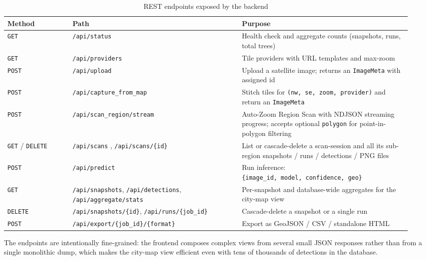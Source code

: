 \begin{longtable}[]{@{}>{\raggedright\arraybackslash}p{0.158\linewidth} >{\raggedright\arraybackslash}p{0.396\linewidth} >{\raggedright\arraybackslash}p{0.396\linewidth}@{}}
\caption{REST endpoints exposed by the backend}\\
\endfirsthead

\toprule\noalign{}
\textbf{Method} & \textbf{Path} & \textbf{Purpose} \\
\midrule\noalign{}
\endhead
\bottomrule\noalign{}
\endlastfoot
\texttt{GET} & \texttt{/api/status} & Health check and aggregate counts (snapshots, runs, total trees) \\
\texttt{GET} & \texttt{/api/providers} & Tile providers with URL templates and max-zoom \\
\texttt{POST} & \texttt{/api/upload} & Upload a satellite image; returns an \texttt{ImageMeta} with assigned id \\
\texttt{POST} & \texttt{/api/capture\_from\_map} & Stitch tiles for \texttt{(nw,\ se,\ zoom,\ provider)} and return an \texttt{ImageMeta} \\
\texttt{POST} & \texttt{/api/scan\_region/stream} & Auto-Zoom Region Scan with NDJSON streaming progress; accepts optional \texttt{polygon} for point-in-polygon filtering \\
\texttt{GET} / \texttt{DELETE} & \texttt{/api/scans} , \texttt{/api/scans/\{id\}} & List or cascade-delete a scan-session and all its sub-region snapshots / runs / detections / PNG files \\
\texttt{POST} & \texttt{/api/predict} & Run inference: \texttt{\{image\_id,\ model,\ confidence,\ geo\}} \\
\texttt{GET} & \texttt{/api/snapshots}, \texttt{/api/detections}, \texttt{/api/aggregate/stats} & Per-snapshot and database-wide aggregates for the city-map view \\
\texttt{DELETE} & \texttt{/api/snapshots/\{id\}}, \texttt{/api/runs/\{job\_id\}} & Cascade-delete a snapshot or a single run \\
\texttt{POST} & \texttt{/api/export/\{job\_id\}/\{format\}} & Export as GeoJSON / CSV / standalone HTML \\
\end{longtable}

The endpoints are intentionally fine-grained: the frontend composes complex views from several small JSON responses rather than from a single monolithic dump, which makes the city-map view efficient even with tens of thousands of detections in the database.

\newpage
